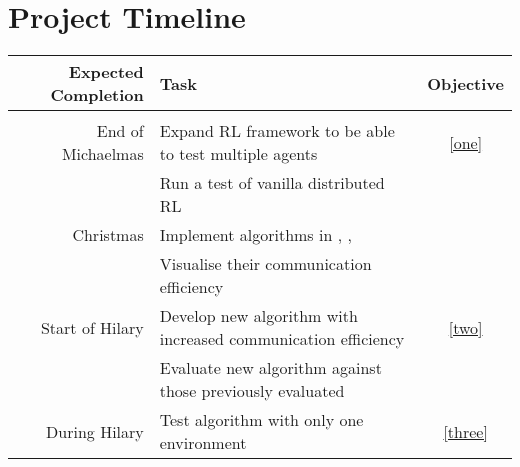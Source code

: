 \documentclass[letterpaper,11pt]{article}
\begin{document}
	


\section{Project Timeline}

\begin{tabular}{r | l | c}

Expected Completion & Task & Objective \\
\hline
& & \\
End of Michaelmas & Expand RL framework to be able to test multiple agents & \ref{one}\\
& Run a test of vanilla distributed RL & \\
Christmas & Implement algorithms in \cite{EventBasedDQL}, \cite{ComEfficientDRL}, \cite{FederatedRL} & \\
& Visualise their communication efficiency & \\
Start of Hilary & Develop new algorithm with increased communication efficiency & \ref{two} \\
& Evaluate new algorithm against those previously evaluated & \\
During Hilary & Test algorithm with only one environment & \ref{three} \\

\end{tabular}

\end{document}
